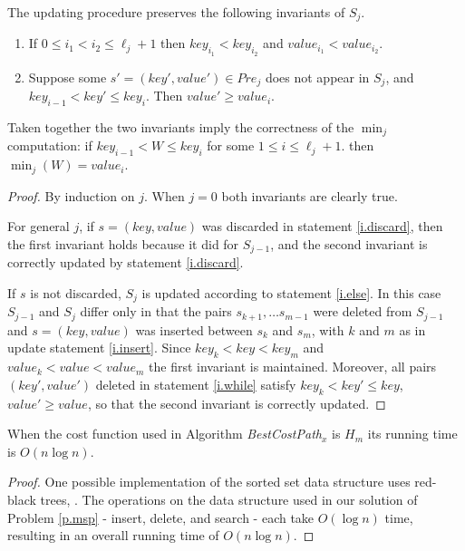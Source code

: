 \begin{theorem}\label{p.kmu} The updating procedure preserves the following invariants of $S_j$.
  \begin{enumerate}
  	\item If $0\leq i_1< i_2 \leq \ell_j+1$ then $key_{i_1}< key_{i_2}$ and 
  	$value_{i_1} < value_{i_2}$.
  	\item Suppose some $s'=(key',value') \in Pre_j$ does not appear in $S_j$, and
  	$key_{i-1} < key' \leq key_i$. Then $value'\geq value_i$.
   \end{enumerate}
   Taken together the two invariants imply the correctness of the $\min_j$ computation: if $key_{i-1}<W\leq key_{i}$ for some $1\leq i \leq \ell_j+1$. then 
  	$\min_j(W)=value_{i}$.
\end{theorem}
\begin{proof}
By induction on $j$. When $j=0$ both invariants are clearly true.

For general $j$, if $s=(key,value)$ was discarded in statement \ref{i.discard}, then the first invariant holds because it did for $S_{j-1}$, and the second invariant is correctly updated
by statement \ref{i.discard}. 

If $s$ is not discarded, $S_j$ is updated according to statement \ref{i.else}. In this case $S_{j-1}$ and $S_j$ differ only in that 
the pairs $s_{k+1},\ldots s_{m-1}$ were deleted from $S_{j-1}$ and $s=(key,value)$ was
inserted between $s_k$ and $s_m$, with $k$ and $m$ as in
update statement \ref{i.insert}. Since $key_k<key <key_m$ and 
$value_k < value <value_m$ the first invariant is maintained.
Moreover, all pairs $(key',value')$
deleted in statement \ref{i.while}
satisfy $key_k<key'\leq key$, $value'\geq value$, so that the second invariant is correctly
updated.
\end{proof}
\begin{theorem}\label{t.linear-m}
	When the cost function used in Algorithm \emph{BestCostPath}$_x$ is $H_m$ its running time is $O(n\log n)$.
\end{theorem}
\begin{proof}
One possible implementation of the sorted set data structure uses red-black trees, \cite{guibas}.
The operations on the data structure used in our solution of Problem \ref{p.msp} -  insert, delete, and search - each take $O(\log n)$ time, resulting 
in an overall running time of $O(n \log n)$.
\end{proof}


